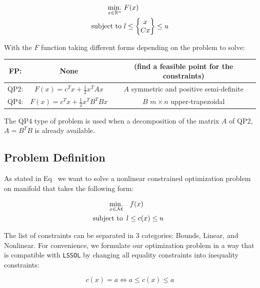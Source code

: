 \begin{align}
  \operatorname*{min.}_{x\in \mathbb{R}^n}\ &{F(x)}\\
  \text{subject to}\  & l\leq \begin{Bmatrix}
    x\\
    Cx
  \end{Bmatrix}
  \leq u
\end{align}

With the $F$ function taking different forms depending on the problem to solve:
\begin{table} [H]
\centering
\begin{tabular}{ccc}
  \toprule
  FP:\@ & None & (find a feasible point for the constraints)\\
  \midrule
  QP2: & $F(x)=c^T x+\frac{1}{2} x^T A x$ & $A$ symmetric and positive semi-definite \\
  \midrule
  QP4: & $F(x)=c^T x+\frac{1}{2} x^T B^T B x$ & $B$ $m\times n$ upper-trapezoidal \\
  \bottomrule
\end{tabular}
\end{table}

The QP4 type of problem is used when a decomposition of the matrix $A$ of QP2, $A=B^T B$ is already available.

\subsection{Problem Definition}
\label{sub:problem_definition}

As stated in Eq~ we want to solve a nonlinear constrained optimization problem on manifold that takes the following form:

\begin{align}
  \operatorname*{min.}_{x \in \mathcal{M}} & \quad f(x)\\
  \text{subject to}&
  \begin{array}{lr}
    l \leq c(x) \leq u \nonumber
  \end{array}
\end{align}

The list of constraints can be separated in 3 categories: Bounds, Linear, and Nonlinear.
For convenience, we formulate our optimization problem in a way that is compatible with {\tt LSSOL} by changing all equality constraints into inequality constraints:

\begin{equation}
  c(x) = a \Leftrightarrow a \leq c(x) \leq a
\end{equation}

